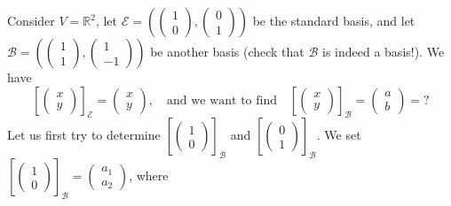 \begin{example}
\label{ex:coordinate_vector_calculation}
Consider $V = \mathbb{R}^2$, let $\mathcal{E} = \left(\left(\begin{smallmatrix} 1 \\ 0 \end{smallmatrix}\right), \left(\begin{smallmatrix} 0 \\ 1 \end{smallmatrix}\right)\right)$ be the standard basis, and let $\mathcal{B} = \left(\left(\begin{smallmatrix} 1 \\ 1 \end{smallmatrix}\right), \left(\begin{smallmatrix} 1 \\ -1 \end{smallmatrix}\right)\right)$ be another basis (check that $\mathcal{B}$ is indeed a basis!). We have
\[
\left[\begin{pmatrix} x \\ y \end{pmatrix}\right]_{\mathcal{E}} = \begin{pmatrix} x \\ y \end{pmatrix}, \quad \text{and we want to find} \quad \left[\begin{pmatrix} x \\ y \end{pmatrix}\right]_{\mathcal{B}} = \begin{pmatrix} a \\ b \end{pmatrix} = ?
\]
Let us first try to determine $\left[\left(\begin{smallmatrix} 1 \\ 0 \end{smallmatrix}\right)\right]_{\mathcal{B}}$ and $\left[\left(\begin{smallmatrix} 0 \\ 1 \end{smallmatrix}\right)\right]_{\mathcal{B}}$. We set $\left[\left(\begin{smallmatrix} 1 \\ 0 \end{smallmatrix}\right)\right]_{\mathcal{B}} = \left(\begin{smallmatrix} a_1 \\ a_2 \end{smallmatrix}\right)$, where

\end{example}
